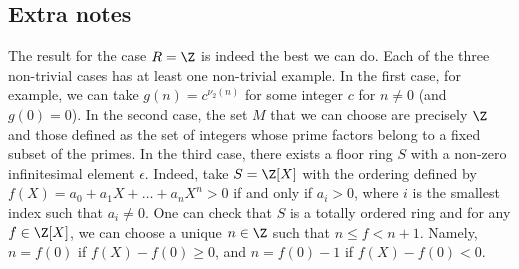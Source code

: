\subsection*{Extra notes}

The result for the case $R = \Z$ is indeed the best we can do.
Each of the three non-trivial cases has at least one non-trivial example.
In the first case, for example, we can take $g(n) = c^{\nu_2(n)}$ for some integer $c$ for $n \neq 0$ (and $g(0) = 0$).
In the second case, the set $M$ that we can choose are precisely $\Z$ and those defined as the set of integers whose prime factors belong to a fixed subset of the primes.
In the third case, there exists a floor ring $S$ with a non-zero infinitesimal element $\epsilon$.
Indeed, take $S = \Z[X]$ with the ordering defined by $f(X) = a_0 + a_1 X + \ldots + a_n X^n > 0$ if and only if $a_i > 0$, where $i$ is the smallest index such that $a_i \neq 0$.
One can check that $S$ is a totally ordered ring and for any $f \in \Z[X]$, we can choose a unique $n \in \Z$ such that $n \leq f < n + 1$.
Namely, $n = f(0)$ if $f(X) - f(0) \geq 0$, and $n = f(0) - 1$ if $f(X) - f(0) < 0$.
